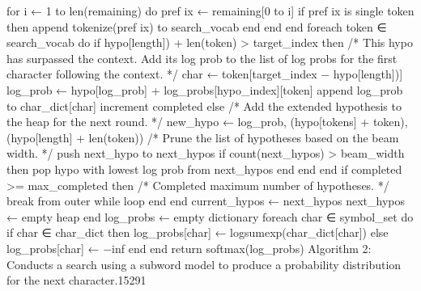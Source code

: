for i ← 1 to len(remaining) do
pref ix ← remaining[0 to i]
if pref ix is single token then
append tokenize(pref ix) to search_vocab
end
end
end
foreach token ∈ search_vocab do
if hypo[length]) + len(token) > target_index then
/* This hypo has surpassed the context. Add its log prob to the list of log probs
for the first character following the context. */
char ← token[target_index − hypo[length])]
log_prob ← hypo[log_prob] + log_probs[hypo_index][token]
append log_prob to char_dict[char]
increment completed
else
/* Add the extended hypothesis to the heap for the next round. */
new_hypo ← log_prob, (hypo[tokens] + token), (hypo[length] + len(token))
/* Prune the list of hypotheses based on the beam width. */
push next_hypo to next_hypos
if count(next_hypos) > beam_width then
pop hypo with lowest log prob from next_hypos
end
end
end
if completed >= max_completed then
/* Completed maximum number of hypotheses. */
break from outer while loop
end
end
current_hypos ← next_hypos
next_hypos ← empty heap
end
log_probs ← empty dictionary
foreach char ∈ symbol_set do
if char ∈ char_dict then
log_probs[char] ← logsumexp(char_dict[char])
else
log_probs[char] ← −inf
end
end
return softmax(log_probs)
Algorithm 2: Conducts a search using a subword model to produce a probability distribution for
the next character.15291
